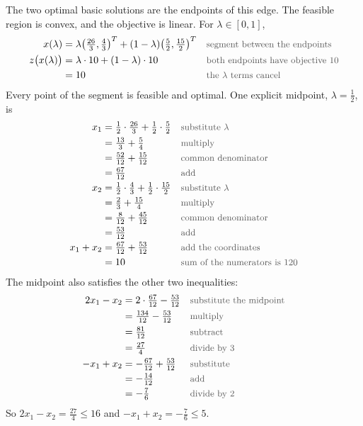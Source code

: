 \documentclass[a4paper,11pt]{article}
\newif\ifexplain
\newcommand{\why}[1]{\text{\small\color{black!65}#1}}
\newcommand{\explain}[1]{\ifexplain\begin{erklbox}#1\end{erklbox}\fi}
\begin{document}
The two optimal basic solutions are the endpoints of this edge. The feasible region is convex, and the objective is linear. For $\lambda\in[0,1]$,
\begin{align*}
x(\lambda)&=\lambda\bigl(\tfrac{26}{3},\tfrac43\bigr)^T+(1-\lambda)\bigl(\tfrac52,\tfrac{15}{2}\bigr)^T&&\why{segment between the endpoints}\\
z\bigl(x(\lambda)\bigr)&=\lambda\cdot 10+(1-\lambda)\cdot 10&&\why{both endpoints have objective $10$}\\
&=10&&\why{the $\lambda$ terms cancel}
\end{align*}
Every point of the segment is feasible and optimal. One explicit midpoint, $\lambda=\tfrac12$, is
\begin{align*}
x_1&=\tfrac12\cdot\tfrac{26}{3}+\tfrac12\cdot\tfrac52&&\why{substitute $\lambda$}\\
&=\tfrac{13}{3}+\tfrac54&&\why{multiply}\\
&=\tfrac{52}{12}+\tfrac{15}{12}&&\why{common denominator}\\
&=\tfrac{67}{12}&&\why{add}\\
x_2&=\tfrac12\cdot\tfrac43+\tfrac12\cdot\tfrac{15}{2}&&\why{substitute $\lambda$}\\
&=\tfrac23+\tfrac{15}{4}&&\why{multiply}\\
&=\tfrac{8}{12}+\tfrac{45}{12}&&\why{common denominator}\\
&=\tfrac{53}{12}&&\why{add}\\
x_1+x_2&=\tfrac{67}{12}+\tfrac{53}{12}&&\why{add the coordinates}\\
&=10&&\why{sum of the numerators is $120$}
\end{align*}
The midpoint also satisfies the other two inequalities:
\begin{align*}
2x_1-x_2&=2\cdot\tfrac{67}{12}-\tfrac{53}{12}&&\why{substitute the midpoint}\\
&=\tfrac{134}{12}-\tfrac{53}{12}&&\why{multiply}\\
&=\tfrac{81}{12}&&\why{subtract}\\
&=\tfrac{27}{4}&&\why{divide by $3$}\\
-x_1+x_2&=-\tfrac{67}{12}+\tfrac{53}{12}&&\why{substitute}\\
&=-\tfrac{14}{12}&&\why{add}\\
&=-\tfrac{7}{6}&&\why{divide by $2$}
\end{align*}
So $2x_1-x_2=\tfrac{27}{4}\leq 16$ and $-x_1+x_2=-\tfrac{7}{6}\leq 5$.
\explain{Die gestrichelte Linie $z=6$ ist parallel zur optimalen Kante und schneidet das Gebiet noch innen. Schiebt man sie weiter, bleibt sie bis $z=10$ im Gebiet und liegt dann genau auf der Kante. Ein einzelner Eckpunkt wäre nur dann die einzige Lösung, wenn die Niveaulinie das Gebiet zuletzt in genau einem Punkt berührt.}
\end{document}
